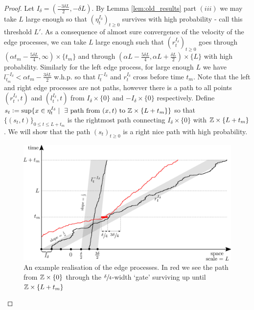 \begin{proof}
Let $I_\delta = \left( \frac{ - 3 \delta L}{2}, - \delta L \right)$. By Lemma \ref{lem:old_results} part $(iii)$ we may take $L$ large enough so that $(\eta^{I_\delta}_t)_{t \geq 0}$ survives with high probability - call this threshold $L'$. As a consequence of almost sure convergence of the velocity of the edge processes, we can take $L$ large enough such that $(r^{I_\delta}_t)_{t \geq 0}$ goes through $(\alpha t_m  - \frac{5 \delta L }{4}, \infty) \times \{t_m\}$ and through $(\alpha L - \frac{5 \delta L}{4}, \alpha L + \frac{\delta L}{2}) \times \{L\}$ with high probability. Similarly for the left edge process, for large enough $L$ we have $l^{- I_\delta}_{t_m} < \alpha t_m - \frac{3 \delta L}{2}$ w.h.p. so that $l^{- I_\delta}_t$ and $r^{I_\delta}_t$ cross before time $t_m$. Note that the left and right edge processes are not paths, however there is a path to all points $(r^{I_\delta}_t, t)$ and $(l^{I_\delta}_t, t)$ from $I_\delta \times \{0\}$ and $-I_\delta \times \{0\}$ respectively. Define $s_t \vcentcolon= \sup\{x \in \eta^{I_\delta}_t \mid\ \exists \text{ path from } (x, t) \text{ to } \mathbb{Z} \times \{L + t_m \} \}$ so that $\{(s_t, t)\}_{0 \leq t \leq L + t_m}$ is the rightmost path connecting $I_\delta \times \{0\}$ with $\mathbb{Z} \times \{L + t_m\}$. We will show that the path $(s_t)_{t \geq 0}$ is a right nice path with high probability. \\

\begin{figure}[!h]
  \includegraphics[width=\linewidth]{construction_right}
  \caption{An example realisation of the edge processes. In red we see the path from $\mathbb{Z} \times \{0\}$ through the $\sfrac{\delta}{4}$-width `gate' surviving up until $\mathbb{Z} \times \{L + t_m\}$ }
  \label{fig:construction_right}
\end{figure}


\end{proof}

